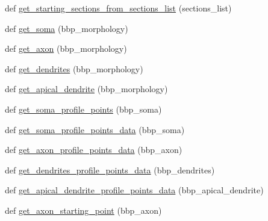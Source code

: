 \begin{DoxyCompactItemize}
def \hyperlink{classmeshy_1_1neuromorphovis_1_1file_1_1readers_1_1morphology_1_1bbp__reader_1_1BBPReader_adb5163ca835c1dfa5a228455cd970e9b}{get\+\_\+starting\+\_\+sections\+\_\+from\+\_\+sections\+\_\+list} (sections\+\_\+list)
\item 
def \hyperlink{classmeshy_1_1neuromorphovis_1_1file_1_1readers_1_1morphology_1_1bbp__reader_1_1BBPReader_a7574785a5bf62f58851819fe97399d73}{get\+\_\+soma} (bbp\+\_\+morphology)
\item 
def \hyperlink{classmeshy_1_1neuromorphovis_1_1file_1_1readers_1_1morphology_1_1bbp__reader_1_1BBPReader_abf9e56ee26eff9d84a7ba13f5edf4de3}{get\+\_\+axon} (bbp\+\_\+morphology)
\item 
def \hyperlink{classmeshy_1_1neuromorphovis_1_1file_1_1readers_1_1morphology_1_1bbp__reader_1_1BBPReader_a9e9de7ee790eb922e5e35e36f5e6b60b}{get\+\_\+dendrites} (bbp\+\_\+morphology)
\item 
def \hyperlink{classmeshy_1_1neuromorphovis_1_1file_1_1readers_1_1morphology_1_1bbp__reader_1_1BBPReader_a39184dd0d59ff1f5952fbe598e9014ed}{get\+\_\+apical\+\_\+dendrite} (bbp\+\_\+morphology)
\item 
def \hyperlink{classmeshy_1_1neuromorphovis_1_1file_1_1readers_1_1morphology_1_1bbp__reader_1_1BBPReader_a02d38e0ef4a772816700da85308b7f1d}{get\+\_\+soma\+\_\+profile\+\_\+points} (bbp\+\_\+soma)
\item 
def \hyperlink{classmeshy_1_1neuromorphovis_1_1file_1_1readers_1_1morphology_1_1bbp__reader_1_1BBPReader_a0d021a3f081a553476d9c3b1f7e24a0c}{get\+\_\+soma\+\_\+profile\+\_\+points\+\_\+data} (bbp\+\_\+soma)
\item 
def \hyperlink{classmeshy_1_1neuromorphovis_1_1file_1_1readers_1_1morphology_1_1bbp__reader_1_1BBPReader_a07c497db1f3793b2ac13231d693265d6}{get\+\_\+axon\+\_\+profile\+\_\+points\+\_\+data} (bbp\+\_\+axon)
\item 
def \hyperlink{classmeshy_1_1neuromorphovis_1_1file_1_1readers_1_1morphology_1_1bbp__reader_1_1BBPReader_a21cc1492d1827b41b43b951e68ee0b59}{get\+\_\+dendrites\+\_\+profile\+\_\+points\+\_\+data} (bbp\+\_\+dendrites)
\item 
def \hyperlink{classmeshy_1_1neuromorphovis_1_1file_1_1readers_1_1morphology_1_1bbp__reader_1_1BBPReader_a2bb009b025f94e1012fc971533d93953}{get\+\_\+apical\+\_\+dendrite\+\_\+profile\+\_\+points\+\_\+data} (bbp\+\_\+apical\+\_\+dendrite)
\item 
def \hyperlink{classmeshy_1_1neuromorphovis_1_1file_1_1readers_1_1morphology_1_1bbp__reader_1_1BBPReader_a26d58c8cbb00c3dcc7628274f5de30a7}{get\+\_\+axon\+\_\+starting\+\_\+point} (bbp\+\_\+axon)

\end{DoxyCompactItemize}
